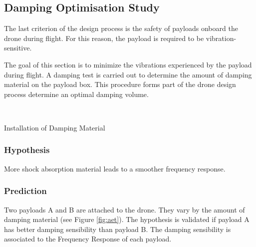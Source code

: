 \subsection{Damping Optimisation Study}

The last criterion of the design process is the safety of payloads onboard the drone during flight. For this reason, the payload is required to be vibration-sensitive. 

The goal of this section is to minimize the vibrations experienced by the payload during flight. A damping test is carried out to determine the amount of damping material on the payload box. This procedure forms part of the drone design process determine an optimal damping volume.


\begin{marginfigure}%
    \raggedright
    \hspace{1cm} \\
    \caption{Installation of Damping Material}
    \label{fig:aet}
\end{marginfigure}

\subsubsection{Hypothesis}
More shock absorption material leads to a smoother frequency response. 


\subsubsection{Prediction}


Two payloads A and B are attached to the drone. They vary by the amount of damping material (see Figure \ref{fig:aet}). The hypothesis is validated if payload A has better damping sensibility than payload B. The damping sensibility is associated to the Frequency Response of each payload. 

